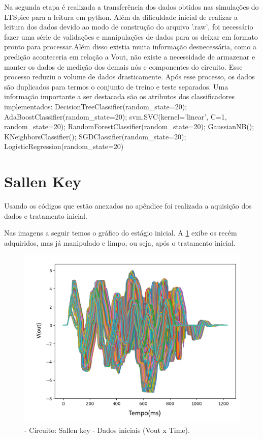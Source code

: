 Na segunda etapa é realizada a transferência dos dados obtidos nas simulações do LTSpice para a leitura em python. Além da dificuldade inicial de realizar a leitura dos dados devido ao modo de construção do arquivo '.raw', foi necessário fazer uma série de validações e manipulações de dados para os deixar em formato pronto para processar.Além disso existia muita informação desnecessária, como a predição aconteceria em relação a Vout, não existe a necessidade de armazenar e manter os dados de medição dos demais nós e componentes do circuito. Esse processo reduziu o volume de dados drasticamente. Após esse processo, os dados são duplicados para termos o conjunto de treino e teste separados.
Uma informação importante a ser destacada são os atributos dos classificadores implementados: DecisionTreeClassifier(random\_state=20);  AdaBoostClassifier(random\_state=20); svm.SVC(kernel='linear', C=1,
random\_state=20); RandomForestClassifier(random\_state=20); GaussianNB(); KNeighborsClassifier(); SGDClassifier(random\_state=20); LogisticRegression(random\_state=20)


\section{\textbf{Sallen Key}}

Usando os códigos que estão anexados no apêndice  foi realizada a aquisição dos dados e tratamento inicial.

 Nas imagens a seguir temos o gráfico do estágio inicial. A  \ref{fig:dadoSalleninicial} exibe os recém adquiridos, mas já manipulado e limpo, ou seja, após o tratamento inicial. 
        
 \begin{figure}[H]
        \begin{center}
        \includegraphics[width=15cm]{./01_Pre_textuais/sallen_figs/dadosPreProc_Sallen_Key_mc_+_4bitPRBS_[FALHA]raw.png}
        \caption{\label{fig:dadoSalleninicial}- Circuito: Sallen key - Dados iniciais (Vout x Time).}
        \end{center}
        \end{figure}
        
